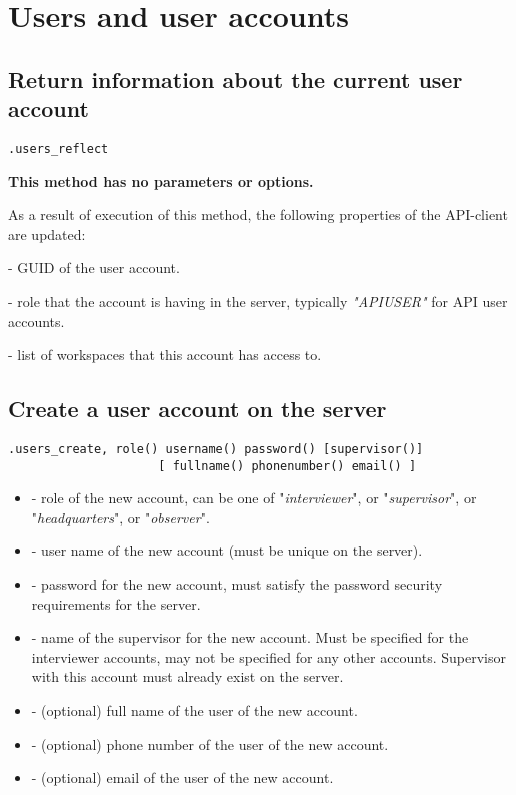 \section{Users and user accounts}

\subsection{Return information about the current user account}
\begin{lstlisting}[style=CommandLineStyle]
.users_reflect
\end{lstlisting}

\textbf{This method has no parameters or options.}

\savedres

As a result of execution of this method, the following properties of the API-client are updated:

\begin{compactitem}
    \item {} - GUID of the user account.
    \item {} - role that the account is having in the server, typically \textit{"APIUSER"} for API user accounts.
    \item {} - list of workspaces that this account has access to.
\end{compactitem}


\subsection{Create a user account on the server}
\begin{lstlisting}[style=CommandLineStyle]
.users_create, role() username() password() [supervisor()]
                     [ fullname() phonenumber() email() ]
\end{lstlisting}

\optsheader
\begin{itemize}
      \item {} - role of the new account, can be one of "\textit{interviewer}", or "\textit{supervisor}", or "\textit{headquarters}", or "\textit{observer}".
      \item {} - user name of the new account (must be unique on the server).
      \item {} - password for the new account, must satisfy the password security requirements for the server.
      \item {} - name of the supervisor for the new account. Must be specified for the interviewer accounts, may not be specified for any other accounts. Supervisor with this account must already exist on the server.
     \item {} - (optional) full name of the user of the new account.
     \item {} - (optional) phone number of the user of the new account.
     \item {} - (optional) email of the user of the new account.
\end{itemize}

